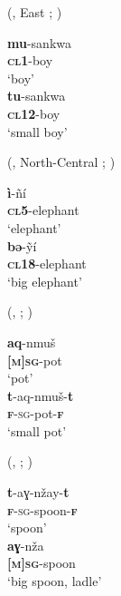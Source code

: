 \documentclass[output=collectionpaper]{langsci/langscibook}
\begin{document}
\ea\label{ex:WDG:32}
 (, East ; \citealt[21]{Carter2002})\\
\begin{xlist}
\ex
\gll	\textbf{mu}-sankwa \\
	\textbf{\textsc{cl1}}-boy \\
\glt	`boy'\\
\ex
\gll \textbf{tu}-sankwa	\\
	\textbf{\textsc{cl}12}-boy \\
\glt	`small boy' \\
\end{xlist}
\z

\ea\label{ex:WDG:33}
 (, North-Central ; \citealt[160]{Santos1996}) \\
\begin{xlist}
\ex
\gll	\textbf{ì}-ñí \\
	\textbf{\textsc{cl}5}-elephant \\
\glt 	`elephant' \\
\ex
\gll 	\textbf{bə}-ỹí \\
	\textbf{\textsc{cl}18}-elephant\\
\glt	`big elephant' \\
\end{xlist}
\z

\ea\label{ex:WDG:34}
 (, ; \citealt[12]{Penchoen1973a})  \\
\begin{xlist}
\ex
\gll \textbf{aq}-nmuš \\
	\textbf{\textsc{[m]sg}}-pot \\
\glt	`pot' \\
\ex
\gll	\textbf{t}-aq-nmuš-\textbf{t} \\
	\textsc{\textbf{f}-sg}-pot-\textbf{\textsc{f}} \\
\glt  	`small pot' \\
\end{xlist}
\z

\ea\label{ex:WDG:35}
 (, ; \citealt[12]{Penchoen1973a})\\
\begin{xlist}
\ex
\gll	\textbf{t}-aɣ-nžay-\textbf{t} \\
	\textsc{\textbf{f}-sg}-spoon-\textbf{\textsc{f}} \\
\glt	`spoon' \\
\ex
\gll 	\textbf{aɣ}-nža \\
\textbf{\textsc{[m]sg}}-spoon \\
\glt	`big spoon, ladle' \\
\end{xlist}
\z
\end{document}
